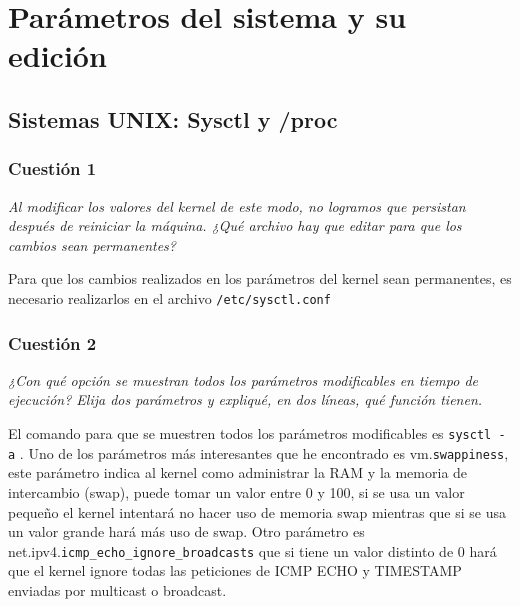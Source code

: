 



\maketitle %
\newpage %
\tableofcontents %
\listoffigures
\newpage

\section{Parámetros del sistema y su edición}
\subsection{Sistemas UNIX: Sysctl y /proc}
\subsubsection{Cuestión 1}
\textit{Al modificar los valores del kernel de este modo, no logramos que persistan después de reiniciar la máquina. ¿Qué archivo hay que editar para que los cambios sean permanentes?}
\newline

Para que los cambios realizados en los parámetros del kernel sean permanentes, es necesario realizarlos en el archivo \texttt{/etc/sysctl.conf }\cite{s1} \cite{s2}

\subsubsection{Cuestión 2}
\textit{¿Con qué opción se muestran todos los parámetros modificables en tiempo de ejecución? Elija dos parámetros y expliqué, en dos líneas, qué función tienen.}
\newline

El comando para que se muestren todos los parámetros modificables es \texttt{sysctl -a} \cite{s3}. Uno de los parámetros más interesantes que he encontrado es vm.\texttt{swappiness}, este parámetro indica al kernel como administrar la RAM y la memoria de intercambio (swap), puede tomar un valor entre 0 y 100,  si se usa un valor pequeño el kernel intentará no hacer uso de memoria swap mientras que si se usa un valor grande hará más uso de swap.\cite{sw} Otro parámetro es net.ipv4.\texttt{icmp\_echo\_ignore\_broadcasts} que si tiene un valor distinto de 0 hará que el kernel ignore todas las peticiones de ICMP ECHO y TIMESTAMP enviadas por multicast o broadcast.\cite{net}

